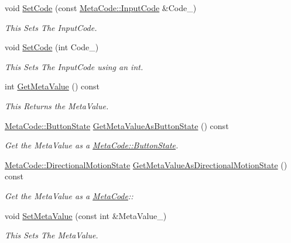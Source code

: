 \begin{DoxyCompactItemize}
void \hyperlink{classphys_1_1MetaCode_ab6759fbee9d039cf248bf76dde0f33dd}{SetCode} (const \hyperlink{classphys_1_1MetaCode_a3e501cbb5bf0f6f1fdb7211465bda8d8}{MetaCode::InputCode} \&Code\_\-)
\begin{DoxyCompactList}\small\item\em This Sets The InputCode. \item\end{DoxyCompactList}\item 
void \hyperlink{classphys_1_1MetaCode_a26dd1a0b3b099b080fade8e33e9dde70}{SetCode} (int Code\_\-)
\begin{DoxyCompactList}\small\item\em This Sets The InputCode using an int. \item\end{DoxyCompactList}\item 
int \hyperlink{classphys_1_1MetaCode_ad8e7e4e7c6cdc6a05b8522910ce90cd4}{GetMetaValue} () const 
\begin{DoxyCompactList}\small\item\em This Returns the MetaValue. \item\end{DoxyCompactList}\item 
\hyperlink{classphys_1_1MetaCode_a2fdfb26b3e50ceb0ccc60bfc4c3d6ac2}{MetaCode::ButtonState} \hyperlink{classphys_1_1MetaCode_a4f8da25e905ac23d935e343ec6d7e695}{GetMetaValueAsButtonState} () const 
\begin{DoxyCompactList}\small\item\em Get the MetaValue as a \hyperlink{classphys_1_1MetaCode_a2fdfb26b3e50ceb0ccc60bfc4c3d6ac2}{MetaCode::ButtonState}. \item\end{DoxyCompactList}\item 
\hyperlink{classphys_1_1MetaCode_ad6ed6266b5f4219a6f5da29ebe018757}{MetaCode::DirectionalMotionState} \hyperlink{classphys_1_1MetaCode_a461d2c8c077838889ef33ef54284f7e1}{GetMetaValueAsDirectionalMotionState} () const 
\begin{DoxyCompactList}\small\item\em Get the MetaValue as a \hyperlink{classphys_1_1MetaCode}{MetaCode}:: \item\end{DoxyCompactList}\item 
void \hyperlink{classphys_1_1MetaCode_a31a6390626b08c1bbf08e3f68d2ea764}{SetMetaValue} (const int \&MetaValue\_\-)
\begin{DoxyCompactList}\small\item\em This Sets The MetaValue. \item\end{DoxyCompactList}\item 

\end{DoxyCompactItemize}

